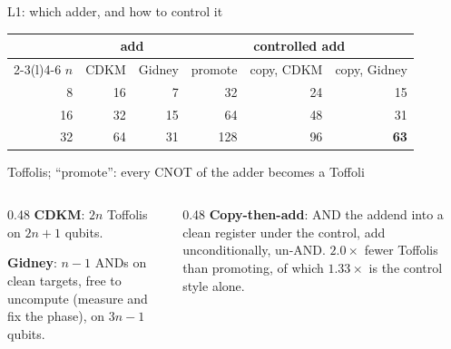 \documentclass[aspectratio=169,11pt]{beamer}
\begin{document}
\setcounter{framenumber}{80}
\begin{frame}{L1: which adder, and how to control it}
  \centering\footnotesize
  \renewcommand{\arraystretch}{1.12}
  \begin{tabular}{@{}rrrrrr@{}}
    \toprule
    & \multicolumn{2}{c}{add} & \multicolumn{3}{c}{controlled add} \\
    \cmidrule(lr){2-3}\cmidrule(l){4-6}
    $n$ & CDKM & Gidney & promote & copy, CDKM & copy, Gidney \\
    \midrule
    8 & 16 & 7 & 32 & 24 & 15 \\
    16 & 32 & 15 & 64 & 48 & 31 \\
    32 & 64 & 31 & 128 & 96 & \textbf{63} \\
    \bottomrule
  \end{tabular}\par
  {\scriptsize Toffolis; ``promote'': every CNOT of the adder becomes a Toffoli}\par
  \vskip3mm
  \raggedright
  \begin{columns}[T]
    \begin{column}{0.48\textwidth}
      \small \textbf{CDKM}: $2n$ Toffolis on $2n+1$ qubits.\par\vskip1mm
      \textbf{Gidney}: $n-1$ ANDs on clean targets, free to uncompute (measure and fix the phase), on $3n-1$ qubits.
    \end{column}
    \begin{column}{0.48\textwidth}
      \small \textbf{Copy-then-add}: AND the addend into a clean register under the control, add unconditionally, un-AND. $2.0\times$ fewer Toffolis than promoting, of which $1.33\times$ is the control style alone.
    \end{column}
  \end{columns}
\end{frame}
\end{document}
